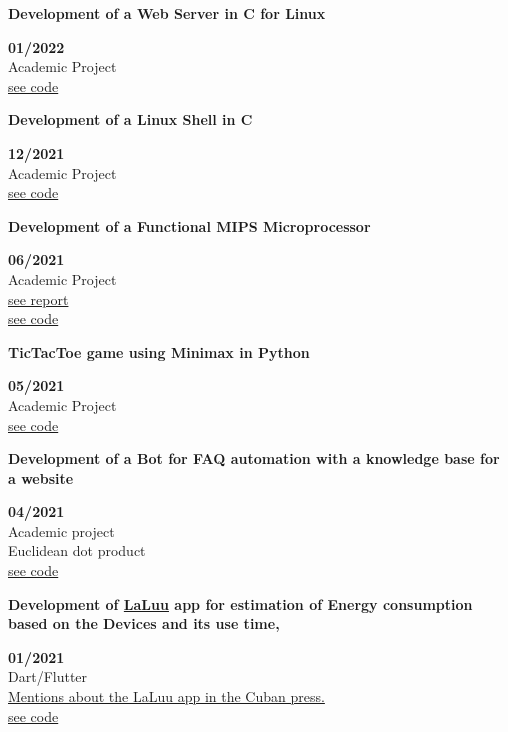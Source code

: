 \documentclass[a4paper,12pt]{article}
\begin{document}
\begin{minipage}{\textwidth}
\parbox{0.8\linewidth}{\textbf{Development of a Web Server in C for Linux}} \hfill \textbf{01/2022}\\
Academic Project\\
\href{https://github.com/geeksLabTech/web_server}{see code}\\
\end{minipage}
\begin{minipage}{\textwidth}
\parbox{0.8\linewidth}{\textbf{Development of a Linux Shell in C}} \hfill \textbf{12/2021}\\
Academic Project\\
\href{https://github.com/geeksLabTech/SO_Shell}{see code}\\
\end{minipage}
\begin{minipage}{\textwidth}
\parbox{0.8\linewidth}{\textbf{Development of a Functional MIPS Microprocessor}} \hfill \textbf{06/2021}\\
Academic Project\\
\href{https://github.com/JavierOramas/MIPS-Micro/blob/master/informe.pdf}{see report}\\
\href{https://github.com/JavierOramas/MIPS-Micro}{see code}\\
\end{minipage}
\begin{minipage}{\textwidth}
\parbox{0.8\linewidth}{\textbf{TicTacToe game using Minimax in Python}} \hfill \textbf{05/2021}\\
Academic Project\\
\href{https://github.com/JavierOramas/TicTacToe_AI}{see code}\\
\end{minipage}
\begin{minipage}{\textwidth}
\parbox{0.8\linewidth}{\textbf{Development of a Bot for FAQ automation with a knowledge base for a website}} \hfill \textbf{04/2021}\\
Academic project\\
Euclidean dot product\\
\href{https://github.com/JavierOramas/FAQ-Chat-Bot-Nous}{see code}\\
\end{minipage}
\begin{minipage}{\textwidth}
\parbox{0.8\linewidth}{\textbf{Development of \hyperref[sec:laluu]{LaLuu} app for estimation of Energy consumption based on the Devices and its use time, }} \hfill \textbf{01/2021}\\
Dart/Flutter\\
\hyperref[sec:laluu_press]{Mentions about the LaLuu app in the Cuban press.}\\
\href{https://github.com/geeksLabTech/LaLuu}{see code}\\
\end{minipage}
\end{document}
